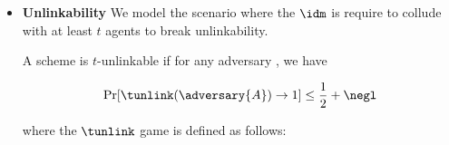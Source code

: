 \begin{itemize}
\begin{definition}
\begin{pchstack}[center, space=0.2cm, boxed]
\begin{pcvstack}
    
    \end{pcvstack}
    
    \end{pchstack}

\end{definition}
    \item \textbf{Unlinkability} We model the scenario where the $\idm$ is require to collude with at least $t$ agents to break unlinkability.

\begin{definition}
A \primitive scheme is $t$-unlinkable if for any \ppt adversary  , we have

\begin{align*}
    \Pr[\tunlink(\adversary{A}) \rightarrow 1] \le \frac{1}{2} + \negl
\end{align*}

where the $\tunlink$ game is defined as follows:

\begin{pchstack}[center, space=0.2cm, boxed]
\begin{pcvstack}


\end{pcvstack}
\end{pchstack}
\end{definition}
\end{itemize}
